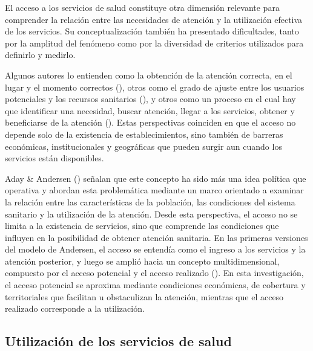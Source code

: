 \documentclass[
  spanish,
  a4paper,
  oneside]{scrbook}
\begin{document}
El acceso a los servicios de salud constituye otra dimensión relevante
para comprender la relación entre las necesidades de atención y la
utilización efectiva de los servicios. Su conceptualización también ha
presentado dificultades, tanto por la amplitud del fenómeno como por la
diversidad de criterios utilizados para definirlo y medirlo.

Algunos autores lo entienden como la obtención de la atención correcta,
en el lugar y el momento correctos
(), otros como el grado de ajuste entre los usuarios potenciales y
los recursos sanitarios
(), y
otros como un proceso en el cual hay que identificar una necesidad,
buscar atención, llegar a los servicios, obtener y beneficiarse de la
atención (). Estas perspectivas coinciden en que el acceso no depende solo de
la existencia de establecimientos, sino también de barreras económicas,
institucionales y geográficas que pueden surgir aun cuando los servicios
están disponibles.

Aday \& Andersen () señalan que
este concepto ha sido más una idea política que operativa y abordan esta
problemática mediante un marco orientado a examinar la relación entre
las características de la población, las condiciones del sistema
sanitario y la utilización de la atención. Desde esta perspectiva, el
acceso no se limita a la existencia de servicios, sino que comprende las
condiciones que influyen en la posibilidad de obtener atención
sanitaria. En las primeras versiones del modelo de Andersen, el acceso
se entendía como el ingreso a los servicios y la atención posterior, y
luego se amplió hacia un concepto multidimensional, compuesto por el
acceso potencial y el acceso realizado
(). En
esta investigación, el acceso potencial se aproxima mediante condiciones
económicas, de cobertura y territoriales que facilitan u obstaculizan la
atención, mientras que el acceso realizado corresponde a la utilización.

\subsection{Utilización de los servicios de
salud}\label{utilizaciuxf3n-de-los-servicios-de-salud}
\end{document}
